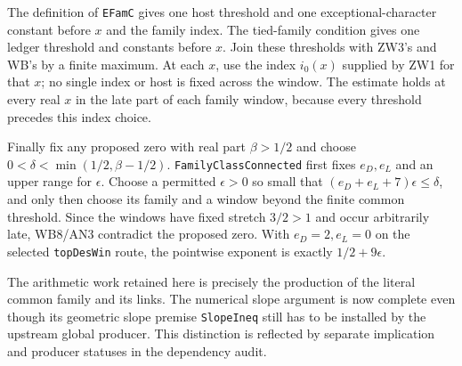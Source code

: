 The definition of \texttt{EFamC} gives one host threshold and one
exceptional-character constant before $x$ and the family index.
The tied-family condition gives one ledger threshold and constants
before $x$.  Join these thresholds with ZW3's and WB's by a finite
maximum.  At each $x$, use the index $i_0(x)$ supplied by ZW1
for that $x$; no single index or host is fixed across the window.
The estimate holds at every real $x$ in the late part of each family
window, because every threshold precedes this index choice.

Finally fix any proposed zero with real part $\beta>1/2$ and choose
$0<\delta<\min(1/2,\beta-1/2)$.
\texttt{FamilyClassConnected} first fixes $e_D,e_L$ and an upper
range for $\epsilon$.  Choose a permitted $\epsilon>0$ so small
that $(e_D+e_L+7)\epsilon\le\delta$, and only then choose its
family and a window beyond the finite common threshold.  Since the
windows have fixed stretch $3/2>1$ and occur arbitrarily late,
WB8/AN3 contradict the proposed zero.  With
$e_D=2,e_L=0$ on the selected \texttt{topDesWin} route, the
pointwise exponent is exactly $1/2+9\epsilon$.

The arithmetic work retained here is precisely the production of the
literal common family and its links.  The numerical slope argument is
now complete even though its geometric slope premise
\texttt{SlopeIneq} still has to be installed by the upstream global
producer.  This distinction is reflected by separate implication and
producer statuses in the dependency audit.
